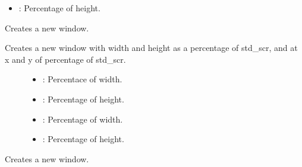 \documentclass[letterpaper,10pt,english]{sphinxmanual}
\begin{document}
\begin{fulllineitems}
\begin{fulllineitems}
\begin{description}
\begin{itemize}
\item {} 
: Percentage of height. 

\end{itemize}

\end{description}


\end{fulllineitems}


\begin{fulllineitems}
\label{\detokenize{index:_CPPv2N7ostendo6Window6WindowEdddd}}%
\pysigstartmultiline
{}\label{\detokenize{index:Pessumclassostendo_1_1Window_1ab6788bb11963c0985833e93102e06b54}}%
\pysigstopmultiline
Creates a new window. 

Creates a new window with width and height as a percentage of std\_scr, and at x and y of percentage of std\_scr. \begin{description}
\item[{}] \leavevmode
{\hyperref[\detokenize{index:Pessumnamespaceostendo_1a4c5850c8a109e159e874ecce8a5dc62a}]{}} 

\item[{}] \leavevmode\begin{itemize}
\item {} 
: Percentace of width. 

\item {} 
: Percentage of height. 

\item {} 
: Percentage of width. 

\item {} 
: Percentage of height. 

\end{itemize}

\end{description}


\end{fulllineitems}


\begin{fulllineitems}
\label{\detokenize{index:_CPPv2N7ostendo6Window6WindowEddii}}%
\pysigstartmultiline
{}\label{\detokenize{index:Pessumclassostendo_1_1Window_1acdd8f7fe6ea1dd1f2c0369f70ec9f7f0}}%
\pysigstopmultiline
Creates a new window. 


\end{fulllineitems}
\end{fulllineitems}
\end{document}
